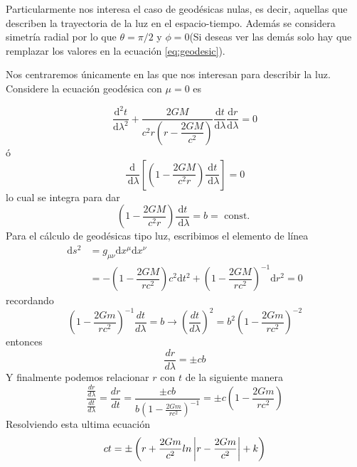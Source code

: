 Particularmente nos interesa el caso de geodésicas nulas, es decir, aquellas que describen la trayectoria de la luz en el espacio-tiempo. Además se considera simetría radial por lo que $\theta=\pi/2$ y $\phi=0$(Si deseas ver las demás solo hay que remplazar los valores en la ecuación \ref{eq:geodesic}).

Nos centraremos únicamente en las que nos interesan para describir la luz. Considere  la ecuación geodésica con $\mu=0$ es

$$
    \frac{\mathrm{d}^2 t}{\mathrm{d} \lambda^2}+\dfrac{2 G M}{c^2 r\left(r - \dfrac{2 G M}{c^2}\right)} \frac{\mathrm{d} t}{\mathrm{d} \lambda} \frac{\mathrm{d} r}{\mathrm{d} \lambda}=0
$$
ó
$$
    \frac{\mathrm{d}}{\mathrm{~d} \lambda}\left[\left(1-\dfrac{2 G M}{c^2 r}\right) \frac{\mathrm{d} t}{\mathrm{~d} \lambda}\right]=0
$$
lo cual se integra para dar
$$
    \left(1-\dfrac{2 G M}{c^2 r}\right) \frac{\mathrm{d} t}{\mathrm{~d} \lambda}=b=\text { const. }
$$
Para el cálculo de geodésicas tipo luz, escribimos el elemento de línea
\begin{equation}
    \begin{aligned}
        \mathrm{d} s^2 & =g_{\mu \nu} \mathrm{d} x^\mu \mathrm{d} x^\nu                                                                      \\
                       & =-\left(1-\dfrac{2 G M}{r c^2}\right)c^2 \mathrm{d} t^2+\left(1-\dfrac{2 G M}{r c^2}\right)^{-1} \mathrm{d} r^2 = 0
    \end{aligned}
\end{equation}
recordando
\begin{equation}
    \left(1-\frac{2 G m}{r c^2}\right)^{-1} \frac{dt}{d\lambda}  = b \rightarrow  \left(\frac{dt}{d\lambda}\right)^2 = b^2 \left(1-\frac{2 G m}{r c^2}\right)^{-2}
\end{equation}
entonces
\begin{equation}
    \frac{d r }{d \lambda}= \pm cb
\end{equation}
Y finalmente podemos relacionar $r$ con $t$  de la siguiente manera
\begin{equation}
    \frac{\frac{dr}{d\lambda}}{\frac{dt}{d\lambda}} =   \frac{dr}{dt} =  \frac{\pm cb }{ b \left(1-\frac{2 G m}{r c^2}\right)^{-1}} = \pm c \left(1-\frac{2 G m}{r c^2}\right)
\end{equation}
Resolviendo esta ultima ecuación
\begin{equation}
    ct = \pm \left(r + \frac{2 G m}{c^2}ln\left| r -\frac{2 G m}{c^2}  \right| + k \right)
\end{equation}
